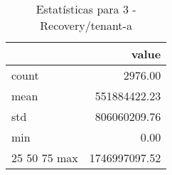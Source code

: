 \begin{table}[htbp]
\caption{Estatísticas para 3 - Recovery/tenant-a}
\label{tab:3_-_recovery_tenant-a_summary}
\begin{tabular}{lr}
\toprule
 & value \\
\midrule
count & 2976.00 \\
mean & 551884422.23 \\
std & 806060209.76 \\
min & 0.00 \\
25%
50%
75%
max & 1746997097.52 \\
\bottomrule
\end{tabular}
\end{table}
